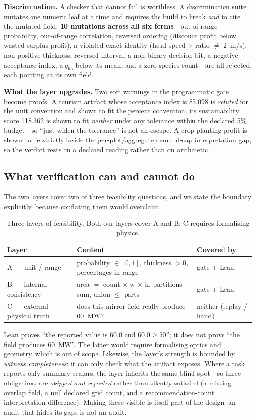 \textbf{Discrimination.} A checker that cannot fail is worthless. A discrimination suite mutates one numeric leaf at a time and requires the build to break \emph{and} to cite the mutated field. \textbf{10 mutations across all six forms}---out-of-range probability, out-of-range correlation, reversed ordering (discount profit below wasted-surplus profit), a violated exact identity (head speed $\times$ ratio $\ne$ 2~m/s), non-positive thickness, reversed interval, a non-binary decision bit, a negative acceptance index, a $q_{95}$ below its mean, and a zero species count---are all rejected, each pointing at its own field.

\textbf{What the layer upgrades.} Two soft warnings in the programmatic gate become proofs. A tourism artifact whose acceptance index is 85.098 is \emph{refuted} for the unit convention and shown to fit the percent convention; its sustainability score 118.362 is shown to fit \emph{neither} under any tolerance within the declared 5\% budget---so ``just widen the tolerance'' is not an escape. A crop-planting profit is shown to lie strictly inside the per-plot/aggregate demand-cap interpretation gap, so the verdict rests on a declared reading rather than on arithmetic.

\subsection{What verification can and cannot do}
\label{sec:abc}
The two layers cover two of three feasibility questions, and we state the boundary explicitly, because conflating them would overclaim.

\begin{table}[h]
\centering
\small
\caption{Three layers of feasibility. Both our layers cover A and B; C requires formalising physics.}
\label{tab:abc}
\begin{tabular}{@{}lp{6.4cm}l@{}}
\toprule
Layer & Content & Covered by \\
\midrule
A --- unit / range & probability $\in[0,1]$, thickness $>0$, percentages in range & gate + Lean \\
B --- internal consistency & area $=$ count $\times$ w $\times$ h, partitions sum, union $\le$ parts & gate + Lean \\
C --- external physical truth & does this mirror field really produce 60~MW? & neither (replay / hand) \\
\bottomrule
\end{tabular}
\end{table}

Lean proves ``the reported value is 60.0 and $60.0\ge60$''; it does not prove ``the field produces 60~MW''. The latter would require formalising optics and geometry, which is out of scope. Likewise, the layer's strength is bounded by \emph{witness completeness}: it can only check what the artifact exposes. Where a task reports only summary scalars, the layer inherits the same blind spot---so three obligations are \emph{skipped and reported} rather than silently satisfied (a missing overlap field, a null declared grid count, and a recommendation-count interpretation difference). Making these visible is itself part of the design: an audit that hides its gaps is not an audit.
